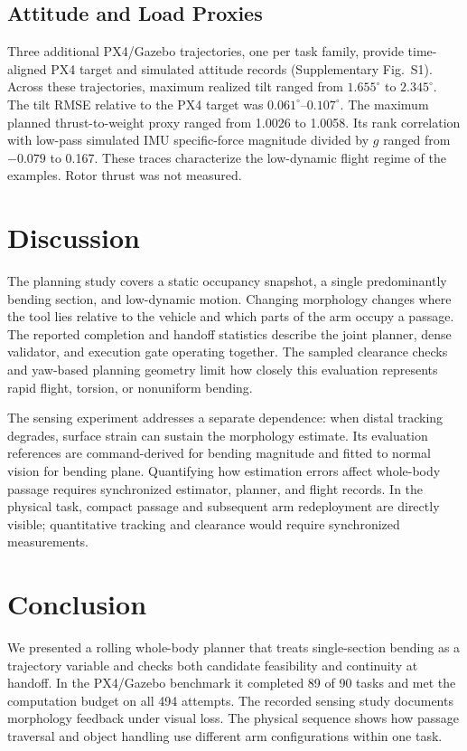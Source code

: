 \documentclass[journal,twoside]{IEEEtran}
\begin{document}
\subsection{Attitude and Load Proxies}
Three additional PX4/Gazebo trajectories, one per task family, provide time-aligned PX4 target and simulated attitude records (Supplementary Fig.~S1). Across these trajectories, maximum realized tilt ranged from $1.655^\circ$ to $2.345^\circ$. The tilt RMSE relative to the PX4 target was $0.061^\circ$--$0.107^\circ$. The maximum planned thrust-to-weight proxy ranged from 1.0026 to 1.0058. Its rank correlation with low-pass simulated IMU specific-force magnitude divided by $g$ ranged from $-0.079$ to 0.167. These traces characterize the low-dynamic flight regime of the examples. Rotor thrust was not measured.



\section{Discussion}\label{sec:discussion}
The planning study covers a static occupancy snapshot, a single predominantly bending section, and low-dynamic motion. Changing morphology changes where the tool lies relative to the vehicle and which parts of the arm occupy a passage. The reported completion and handoff statistics describe the joint planner, dense validator, and execution gate operating together. The sampled clearance checks and yaw-based planning geometry limit how closely this evaluation represents rapid flight, torsion, or nonuniform bending.

The sensing experiment addresses a separate dependence: when distal tracking degrades, surface strain can sustain the morphology estimate. Its evaluation references are command-derived for bending magnitude and fitted to normal vision for bending plane. Quantifying how estimation errors affect whole-body passage requires synchronized estimator, planner, and flight records. In the physical task, compact passage and subsequent arm redeployment are directly visible; quantitative tracking and clearance would require synchronized measurements.

\section{Conclusion}\label{sec:conclusion}
We presented a rolling whole-body planner that treats single-section bending as a trajectory variable and checks both candidate feasibility and continuity at handoff. In the PX4/Gazebo benchmark it completed 89 of 90 tasks and met the computation budget on all 494 attempts. The recorded sensing study documents morphology feedback under visual loss. The physical sequence shows how passage traversal and object handling use different arm configurations within one task.

\FloatBarrier
\balance


\end{document}

